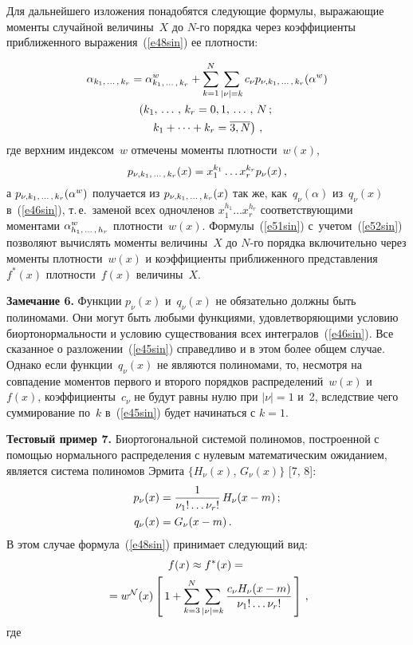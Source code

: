 \begin{multicols}{2}
Для дальнейшего изложения понадобятся следующие формулы, выражающие
моменты случайной величины~$X$ до $N$-го порядка через
коэффициенты приближенного выражения~(\ref{e48sin}) ее плотности:
\vspace*{-6pt}

\noindent
\begin{multline}
\alpha_{k_1,\,\ldots\,,\, k_r} =\alpha_{k_1,\,\ldots\,,\, k_r}^w +\sum\limits_{k=1}^N
    \sum\limits_{\vert \nu\vert=k} c_\nu p_{\nu, k_1,\,\ldots\,,\, k_r} (\alpha^w)\\
\left(k_1,\,\ldots\,,\, k_r = 0,1,\,\ldots\,,\, N\,;\right.\\
\left.k_1 +\cdots + k_r = \overline{3, N}\right )\,,
    \label{e51sin}
    \end{multline}
где верхним индексом~$w$ отмечены моменты плотности~$w(x)$,
\begin{equation}
p_{\nu, k_1,\,\ldots\,,\, k_r} (x) = x_1^{k_1} \ldots x_r^{k_r} p_\nu  (x)\,,
\label{e52sin}
\end{equation}
а $p_{\nu, k_1,\,\ldots\,,\, k_r} (\alpha^w)$ получается из $p_{\nu, k_1,\,\ldots\,,\,
k_r} (x)$ так же, как~$q_\nu (\alpha)$ из~$q_\nu (x)$ в~(\ref{e46sin}),
 т.\,е.\ заменой всех одночленов $x_1^{h_1} \ldots x_r^{h_r}$
соответствующими моментами $\alpha_{h_1,\,\ldots\,,\, h_r}^w$ плотности~$w(x)$. Формулы~(\ref{e51sin}) 
с~учетом~(\ref{e52sin}) позволяют вычислять моменты величины~$X$ до $N$-го порядка включительно через\linebreak
 моменты
плотности~$w(x)$ и коэффициенты приближенного представления~$f^* (x)$ плотности~$f(x)$ величины~$X$.

\smallskip

\noindent
\textbf{Замечание 6.} Функции $p_\nu (x)$ и~$q_\nu (x)$ не обязательно должны быть
полиномами. Они могут быть любыми функциями, удовлетворяющими
условию биортонормальности  и условию существования всех
интегралов~(\ref{e46sin}).
Все сказанное о разложении~(\ref{e45sin}) справедливо и в этом более
общем случае. Однако если функции~$q_\nu (x)$ не являются
полиномами, то, несмотря на совпадение моментов первого и второго
порядков распределений~$w(x)$ и~$f(x)$, коэффициенты~$c_\nu$ не
будут равны нулю при $\vert \nu\vert =1$ и~2, вследствие чего
суммирование по~$k$ в~(\ref{e45sin}) будет начинаться с $k=1$.
 
\smallskip

\noindent
\textbf{Тестовый пример 7.}  Биортогональной
системой полиномов, построенной с помощью нормального
распределения с нулевым математическим ожиданием, является система
полиномов Эрмита $\{ H_\nu (x)$, $G_\nu (x)\}$ [7, 8]:
    \begin{align*}
        p_\nu (x)&=\displaystyle\frac{\displaystyle 1\mathstrut}{\displaystyle \nu_1!\ldots \nu_r!\mathstrut}\, H_\nu (x-m)\,;\\
    q_\nu (x)& = G_\nu (x-m)\,.
    \end{align*}
В этом случае формула~(\ref{e48sin}) принимает следующий вид:
    \begin{multline*}
    f(x) \approx f^* (x) ={}\\
    {}= w^{\mathcal N}  (x)\left[\, 1+
    \sum\limits_{k=3}^N \sum\limits_{\vert\nu\vert=k} \displaystyle\frac{\displaystyle c_\nu H_\nu (x-m)\mathstrut}{\displaystyle \nu_1!\ldots\nu_r!\mathstrut}\,\right]\,,
    \end{multline*}
   где
   \pagebreak
    

\end{multicols}
